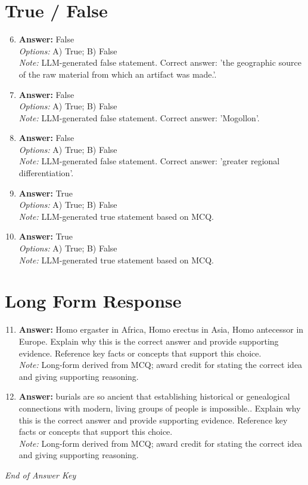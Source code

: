 \documentclass[12pt]{article}
\begin{document}
\section*{True / False}
\begin{enumerate}[label=\arabic*.]
\setcounter{enumi}{5}
\item \textbf{Answer:} False
\\ \textit{Options:} A) True; B) False
\\ \textit{Note:} LLM-generated false statement. Correct answer: 'the geographic source of the raw material from which an artifact was made.'.
\item \textbf{Answer:} False
\\ \textit{Options:} A) True; B) False
\\ \textit{Note:} LLM-generated false statement. Correct answer: 'Mogollon'.
\item \textbf{Answer:} False
\\ \textit{Options:} A) True; B) False
\\ \textit{Note:} LLM-generated false statement. Correct answer: 'greater regional differentiation'.
\item \textbf{Answer:} True
\\ \textit{Options:} A) True; B) False
\\ \textit{Note:} LLM-generated true statement based on MCQ.
\item \textbf{Answer:} True
\\ \textit{Options:} A) True; B) False
\\ \textit{Note:} LLM-generated true statement based on MCQ.
\end{enumerate}

\section*{Long Form Response}
\begin{enumerate}[label=\arabic*.]
\setcounter{enumi}{10}
\item \textbf{Answer:} Homo ergaster in Africa, Homo erectus in Asia, Homo antecessor in Europe. Explain why this is the correct answer and provide supporting evidence. Reference key facts or concepts that support this choice.
\\ \textit{Note:} Long-form derived from MCQ; award credit for stating the correct idea and giving supporting reasoning.
\item \textbf{Answer:} burials are so ancient that establishing historical or genealogical connections with modern, living groups of people is impossible.. Explain why this is the correct answer and provide supporting evidence. Reference key facts or concepts that support this choice.
\\ \textit{Note:} Long-form derived from MCQ; award credit for stating the correct idea and giving supporting reasoning.
\end{enumerate}

\vfill
\noindent\textit{End of Answer Key}
\end{document}
